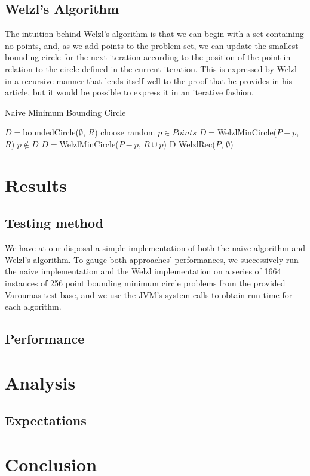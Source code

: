 \documentclass{article}
\begin{document}
\subsection{Welzl's Algorithm}
The intuition behind Welzl's algorithm is that we can begin with a set containing no points, and, as we add points to the problem set, we can update the smallest bounding circle for the next iteration according to the position of the point in relation to the circle defined in the current iteration. This is expressed by Welzl in a recursive manner that lends itself well to the proof that he provides in his article, but it would be possible to express it in an iterative fashion.
\begin{algorithm}
  \caption{Naive Minimum Bounding Circle}
  \begin{algorithmic}[1]
    \State $D = $boundedCircle($\emptyset$, $R$)
    \Else
    \State choose random $p \in Points$
    \State $D = $WelzlMinCircle($P - {p}$, $R$)
    \If $p \notin D$
    \State $D = $WelzlMinCircle($P - {p}$, $R \cup p$)
    \EndIf
    \EndIf
    \State \Return D
    \EndFunction
    \State \Return WelzlRec($P$, $\emptyset$)
    \EndFunction
  \end{algorithmic}
\end{algorithm}
\section{Results}
\subsection{Testing method}
We have at our disposal a simple implementation of both the naive algorithm and Welzl's algorithm. To gauge both approaches' performances, we successively run the naive implementation and the Welzl implementation on a series of 1664 instances of 256 point bounding minimum circle problems from the provided Varoumas test base, and we use the JVM's system calls to obtain run time for each algorithm.
\subsection{Performance}
\section{Analysis}
\subsection{Expectations}
\section{Conclusion}
%
\end{document}

